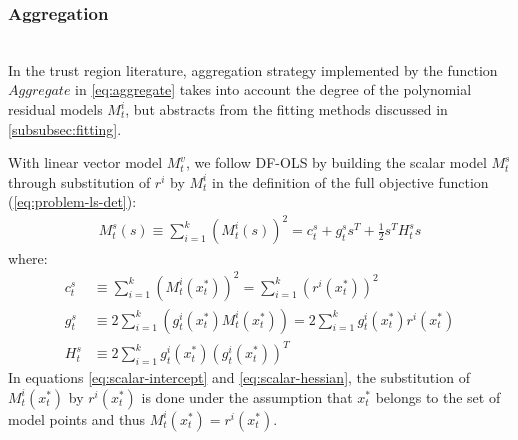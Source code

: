 \subsubsection{Aggregation}
\label{subsubsec:aggregation}
\hfill\\





In the trust region literature, aggregation strategy implemented by the function $Aggregate$ in \ref{eq:aggregate} takes into account the degree of the polynomial residual models $M_t^i$, but abstracts from the fitting methods discussed in \ref{subsubsec:fitting}.

With linear vector model $M_t^v$, we follow DF-OLS by building the scalar model $M_t^s$ through substitution of $r^i$ by $M_t^i$ in the definition of the full objective function (\ref{eq:problem-ls-det}):
\begin{align}
    M_t^s(s)\equiv\sum\limits_{i=1}^k(M_t^i(s))^2 =  c_t^s+g^s_ts^T+\frac{1}{2}s^TH^s_ts
\end{align}
where:
\begin{align}
    c_t^s &\equiv\sum\limits_{i=1}^k(M_t^i(x_t^*))^2 = \sum\limits_{i=1}^k(r^i(x_t^*))^2\label{eq:scalar-intercept}\\
     g^s_t&\equiv2\sum\limits_{i=1}^k(g_t^i(x_t^*)M_t^i(x_t^*))=2\sum\limits_{i=1}^kg_t^i(x_t^*)r^i(x_t^*)\label{eq:scalar-gradient}\\
     H_t^s&\equiv2\sum\limits_{i=1}^kg_t^i(x_t^*)(g_t^i(x_t^*))^T\label{eq:scalar-hessian}
\end{align}
In equations \ref{eq:scalar-intercept} and \ref{eq:scalar-hessian}, the substitution of $M_t^i(x_t^*)$ by $r^i(x_t^*)$ is done under the assumption that $x_t^*$ belongs to the set of model points and thus $M_t^i(x_t^*)=r^i(x_t^*)$.

